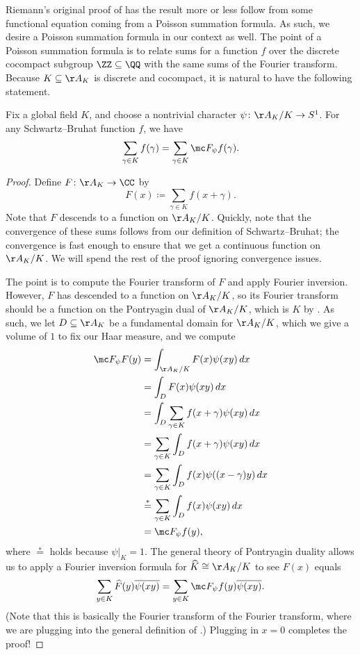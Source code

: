 \documentclass{article}
\begin{document}
Riemann's original proof of  has the result more or less follow from some functional equation coming from a Poisson summation formula. As such, we desire a Poisson summation formula in our context as well. The point of a Poisson summation formula is to relate sums for a function $f$ over the discrete cocompact subgroup $\ZZ\subseteq\QQ$ with the same sums of the Fourier transform. Because $K\subseteq\AA_K$ is discrete and cocompact, it is natural to have the following statement.
\begin{theorem} \label{thm:adelic-p-s}
	Fix a global field $K$, and choose a nontrivial character $\psi\colon\AA_K/K\to S^1$. For any Schwartz--Bruhat function $f$, we have
	\[\sum_{\gamma\in K}f(\gamma)=\sum_{\gamma\in K}\mc F_\psi f(\gamma).\]
\end{theorem}
\begin{proof}
	Define $F\colon\AA_K\to\CC$ by
	\[F(x)\coloneqq\sum_{\gamma\in K}f(x+\gamma).\]
	Note that $F$ descends to a function on $\AA_K/K$. Quickly, note that the convergence of these sums follows from our definition of Schwartz--Bruhat; the convergence is fast enough to ensure that we get a continuous function on $\AA_K/K$. We will spend the rest of the proof ignoring convergence issues.
	
	The point is to compute the Fourier transform of $F$ and apply Fourier inversion. However, $F$ has descended to a function on $\AA_K/K$, so its Fourier transform should be a function on the Pontryagin dual of $\AA_K/K$, which is $K$ by . As such, we let $D\subseteq\AA_K$ be a fundamental domain for $\AA_K/K$, which we give a volume of $1$ to fix our Haar measure, and we compute
	\begin{align*}
		\mc F_\psi F(y) &= \int_{\AA_K/K}F(x)\psi(xy)\,dx \\
		&= \int_DF(x)\psi(xy)\,dx \\
		&= \int_D\sum_{\gamma\in K}f(x+\gamma)\psi(xy)\,dx \\
		&= \sum_{\gamma\in K}\int_Df(x+\gamma)\psi(xy)\,dx \\
		&= \sum_{\gamma\in K}\int_Df(x)\psi((x-\gamma)y)\,dx \\
		&\stackrel*= \sum_{\gamma\in K}\int_Df(x)\psi(xy)\,dx \\
		&= \mc F_\psi f(y),
	\end{align*}
	where $\stackrel*=$ holds because $\psi|_K=1$. The general theory of Pontryagin duality allows us to apply a Fourier inversion formula for $\widehat K\cong\AA_K/K$ to see $F(x)$ equals
	\[\sum_{y\in K}\widehat F(y)\overline{\psi(xy)}=\sum_{y\in K}\mc F_\psi f(y)\overline{\psi(xy)}.\]
	(Note that this is basically the Fourier transform of the Fourier transform, where we are plugging into the general definition of .) Plugging in $x=0$ completes the proof!
\end{proof}
\end{document}
